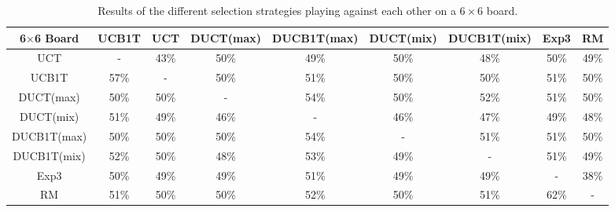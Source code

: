 \documentclass{article}
\begin{document}
\begin{table}[h!]\scriptsize
\centering
\begin{tabular}{|c||c|c|c|c|c|c|c|c|}
									\hline
	6$\times$6 Board	& UCB1T 	& UCT		& DUCT(max)	& DUCB1T(max)	& DUCT(mix)	& DUCB1T(mix)	& Exp3 & RM  \\ \hline
   UCT &    - & 43\% & 50\% & 49\% & 50\% & 48\% & 50\% & 49\% \\ \hline 
 UCB1T & 57\% &    - & 50\% & 51\% & 50\% & 50\% & 51\% & 50\% \\ \hline 
   DUCT(max) & 50\% & 50\% &    - & 54\% & 50\% & 52\% & 51\% & 50\% \\ \hline 
   DUCT(mix) & 51\% & 49\% & 46\% &    - & 46\% & 47\% & 49\% & 48\% \\ \hline 
 DUCB1T(max) & 50\% & 50\% & 50\% & 54\% &    - & 51\% & 51\% & 50\% \\ \hline 
 DUCB1T(mix) & 52\% & 50\% & 48\% & 53\% & 49\% &    - & 51\% & 49\% \\ \hline 
      Exp3 & 50\% & 49\% & 49\% & 51\% & 49\% & 49\% &    - & 38\% \\ \hline 
        RM & 51\% & 50\% & 50\% & 52\% & 50\% & 51\% & 62\% &    - \\ \hline 
\end{tabular}
\caption{Results of the different selection strategies playing against each other on a $6\times6$ board. }%
\label{table:rr_small}
\end{table}
\end{document}
